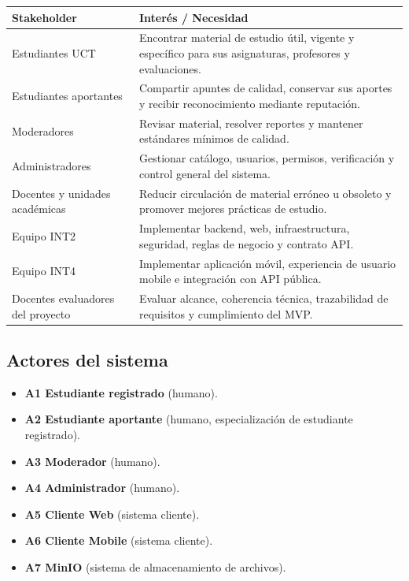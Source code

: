 \documentclass[12pt,a4paper]{article}
\begin{document}
\begin{longtable}{p{} p{}}
\toprule
\textbf{Stakeholder} & \textbf{Interés / Necesidad}\\
\midrule
Estudiantes UCT & Encontrar material de estudio útil, vigente y específico para sus asignaturas, profesores y evaluaciones.\\
Estudiantes aportantes & Compartir apuntes de calidad, conservar sus aportes y recibir reconocimiento mediante reputación.\\
Moderadores & Revisar material, resolver reportes y mantener estándares mínimos de calidad.\\
Administradores & Gestionar catálogo, usuarios, permisos, verificación y control general del sistema.\\
Docentes y unidades académicas & Reducir circulación de material erróneo u obsoleto y promover mejores prácticas de estudio.\\
Equipo INT2 & Implementar backend, web, infraestructura, seguridad, reglas de negocio y contrato API.\\
Equipo INT4 & Implementar aplicación móvil, experiencia de usuario mobile e integración con API pública.\\
Docentes evaluadores del proyecto & Evaluar alcance, coherencia técnica, trazabilidad de requisitos y cumplimiento del MVP.\\
\bottomrule
\end{longtable}

\subsection{Actores del sistema}

\begin{itemize}
    \item \textbf{A1 Estudiante registrado} (humano).
    \item \textbf{A2 Estudiante aportante} (humano, especialización de estudiante registrado).
    \item \textbf{A3 Moderador} (humano).
    \item \textbf{A4 Administrador} (humano).
    \item \textbf{A5 Cliente Web} (sistema cliente).
    \item \textbf{A6 Cliente Mobile} (sistema cliente).
    \item \textbf{A7 MinIO} (sistema de almacenamiento de archivos).
\end{itemize}
\end{document}
